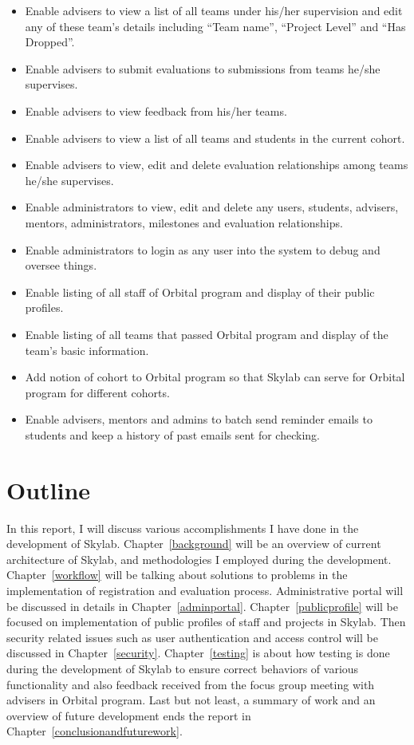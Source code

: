 \begin{itemize}
  \item Enable advisers to view a list of all teams under his/her supervision and edit any of these team's details including ``Team name'', ``Project Level'' and ``Has Dropped''.
  \item Enable advisers to submit evaluations to submissions from teams he/she supervises.
  \item Enable advisers to view feedback from his/her teams.
  \item Enable advisers to view a list of all teams and students in the current cohort.
  \item Enable advisers to view, edit and delete evaluation relationships among teams he/she supervises.
  \item Enable administrators to view, edit and delete any users, students, advisers, mentors, administrators, milestones and evaluation relationships.
  \item Enable administrators to login as any user into the system to debug and oversee things.
  \item Enable listing of all staff of Orbital program and display of their public profiles.
  \item Enable listing of all teams that passed Orbital program and display of the team's basic information.
  \item Add notion of cohort to Orbital program so that Skylab can serve for Orbital program for different cohorts.
  \item Enable advisers, mentors and admins to batch send reminder emails to students and keep a history of past emails sent for checking.
\end{itemize}

\section{Outline}

In this report, I will discuss various accomplishments I have done in the development of Skylab. Chapter~\ref{background} will be an overview of current architecture of Skylab, and methodologies I employed during the development. Chapter~\ref{workflow} will be talking about solutions to problems in the implementation of registration and evaluation process. Administrative portal will be discussed in details in Chapter~\ref{adminportal}. Chapter~\ref{publicprofile} will be focused on implementation of public profiles of staff and projects in Skylab. Then security related issues such as user authentication and access control will be discussed in Chapter~\ref{security}. Chapter~\ref{testing} is about how testing is done during the development of Skylab to ensure correct behaviors of various functionality and also feedback received from the focus group meeting with advisers in Orbital program. Last but not least, a summary of work and an overview of future development ends the report in Chapter~\ref{conclusionandfuturework}.
